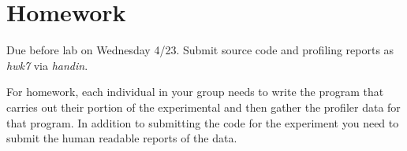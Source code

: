 \documentclass[]{tufte-handout}
\begin{document}
\section{Homework}

\begin{center}
Due before lab on Wednesday 4/23. Submit source code and profiling reports as \textit{hwk7} via \textit{handin}.
\end{center}

For homework, each individual in your group needs to write the program that carries out their portion of the experimental and then gather the profiler data for that program. In addition to submitting the code for the experiment you need to submit the human readable reports of the data. 
\end{document}
